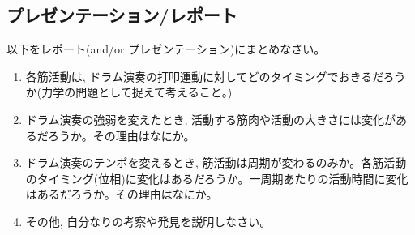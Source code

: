 \documentclass{ltjsarticle}
\begin{document}
\subsection{プレゼンテーション/レポート}

以下をレポート(and/or プレゼンテーション)にまとめなさい。
\begin{enumerate}
  \item 各筋活動は, ドラム演奏の打叩運動に対してどのタイミングでおきるだろうか(力学の問題として捉えて考えること。)
  \item ドラム演奏の強弱を変えたとき, 活動する筋肉や活動の大きさには変化があるだろうか。その理由はなにか。
  \item ドラム演奏のテンポを変えるとき, 筋活動は周期が変わるのみか。各筋活動のタイミング(位相)に変化はあるだろうか。一周期あたりの活動時間に変化はあるだろうか。その理由はなにか。
  \item その他, 自分なりの考察や発見を説明しなさい。
\end{enumerate}
\end{document}
